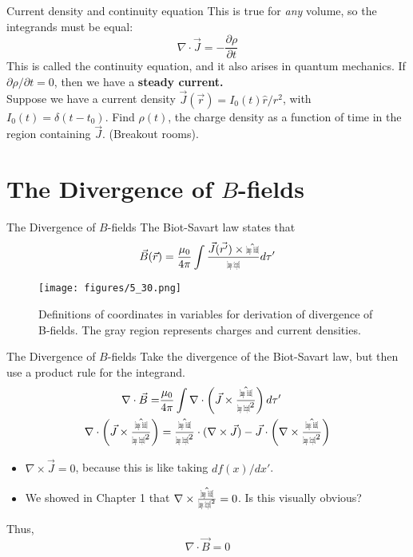 \documentclass{beamer}
\def\rcurs{{\mbox{$\resizebox{.16in}{.08in}{\texttt{[image: ScriptR]}}$}}}
\def\brcurs{{\mbox{$\resizebox{.16in}{.08in}{\texttt{[image: BoldR]}}$}}}
\def\hrcurs{{\mbox{$\hat \brcurs$}}}
\begin{document}
\begin{frame}{Current density and continuity equation}
This is true for \textit{any} volume, so the integrands must be equal:
\begin{equation}
\nabla \cdot \vec{J} = -\frac{\partial \rho}{\partial t}
\end{equation}
This is called the continuity equation, and it also arises in quantum mechanics.  If $\partial\rho/\partial t = 0$, then we have a \textbf{steady current.} \\ \vspace{0.5cm}
Suppose we have a current density $\vec{J}(\vec{r}) = I_0(t) \hat{r}/r^2$, with $I_0(t) = \delta(t-t_0)$.  Find $\rho(t)$, the charge density as a function of time in the region containing $\vec{J}$. (Breakout rooms).
\end{frame}

\section{The Divergence of $B$-fields}

\begin{frame}{The Divergence of $B$-fields}
The Biot-Savart law states that
\begin{equation}
\vec{B}(\vec{r}) = \frac{\mu_0}{4\pi} \int \frac{\vec{J}(\vec{r'}) \times \hrcurs }{\rcurs} d\tau'
\end{equation}
\begin{figure}
\centering
\texttt{[image: figures/5\_30.png]}
\caption{\label{fig:biot} Definitions of coordinates in variables for derivation of divergence of B-fields.  The gray region represents charges and current densities.}
\end{figure}
\end{frame}

\begin{frame}{The Divergence of $B$-fields}
Take the divergence of the Biot-Savart law, but then use a product rule for the integrand.
\begin{align}
\nabla \cdot \vec{B} =& \frac{\mu_0}{4\pi} \int \nabla \cdot \left( \vec{J} \times \frac{\hrcurs}{\rcurs^2}\right) d\tau' \\
\nabla \cdot \left( \vec{J} \times \frac{\hrcurs}{\rcurs^2}\right) &= \frac{\hrcurs}{\rcurs^2} \cdot (\nabla \times \vec{J}) - \vec{J} \cdot \left( \nabla \times \frac{\hrcurs}{\rcurs^2} \right)
\end{align}
\begin{itemize}
\item $\nabla \times \vec{J} = 0$, because this is like taking $df(x)/dx'$.
\item We showed in Chapter 1 that $\nabla \times \frac{\hrcurs}{\rcurs^2} = 0$.  Is this visually obvious?
\end{itemize}
Thus,
\begin{equation}
\boxed{
\nabla \cdot \vec{B} = 0
}
\end{equation}
\end{frame}
\end{document}
